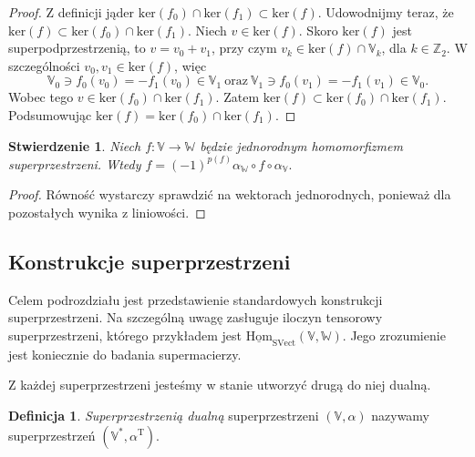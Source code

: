 \documentclass[11pt,a4paper]{report}
\newtheorem{proposition}[theorem]{Stwierdzenie}
\theoremstyle{definition}
\newtheorem{definition}[theorem]{Definicja}
\begin{document}
\begin{proof}
	Z definicji jąder $\mathrm{ker}(f_0) \cap \mathrm{ker}(f_1) \subset \mathrm{ker}(f).$ Udowodnijmy teraz, że $\mathrm{ker}(f) \subset \mathrm{ker}(f_0) \cap \mathrm{ker}(f_1).$ Niech $v \in \mathrm{ker}(f)$. Skoro $\mathrm{ker}(f)$ jest superpodprzestrzenią, to $v = v_0 + v_1$, przy czym $v_k \in \mathrm{ker}(f) \cap \mathbb{V}_k$, dla $k \in \mathbb{Z}_2.$ W szczególności $v_0, v_1 \in \mathrm{ker}(f)$, więc 
	\begin{equation*}
		\mathbb{V}_0 \ni f_0(v_0) =- f_1(v_0) \in \mathbb{V}_1\ \mathrm{oraz}\ \mathbb{V}_1 \ni f_0(v_1) =- f_1(v_1) \in \mathbb{V}_0.
	\end{equation*}
	Wobec tego $v \in \mathrm{ker}(f_0) \cap \mathrm{ker}(f_1).$ Zatem $\mathrm{ker}(f) \subset \mathrm{ker}(f_0) \cap \mathrm{ker}(f_1).$ Podsumowując $\mathrm{ker}(f) = \mathrm{ker}(f_0) \cap \mathrm{ker}(f_1)$.
\end{proof}

\begin{proposition}
	Niech $f:\mathbb{V} \rightarrow \mathbb{W}$ będzie jednorodnym homomorfizmem superprzestrzeni. Wtedy $f = (-1)^{p(f)} \alpha_\mathbb{W} \!\circ\! f \!\circ\! \alpha_\mathbb{V}.$
\end{proposition}

\begin{proof}
	Równość wystarczy sprawdzić na wektorach jednorodnych, ponieważ dla pozostałych wynika z liniowości.
\end{proof}

\subsection{Konstrukcje superprzestrzeni}

Celem podrozdziału jest przedstawienie standardowych konstrukcji superprzestrzeni. Na szczególną uwagę zasługuje iloczyn tensorowy superprzestrzeni, którego przykładem jest $\underline{\mathrm{Hom}}_{\mathrm{SVect}}(\mathbb{V},\mathbb{W})$. Jego zrozumienie jest koniecznie do badania supermacierzy.

Z każdej superprzestrzeni jesteśmy w stanie utworzyć drugą do niej dualną.

\begin{definition}
	\textit{Superprzestrzenią dualną} superprzestrzeni $(\mathbb{V},\alpha)$ nazywamy superprzestrzeń $(\mathbb{V}^*,\alpha^\mathrm{T}).$
\end{definition}
\end{document}

